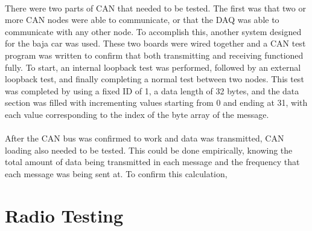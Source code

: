\paragraph{}
There were two parts of CAN that needed to be tested.
The first was that two or more CAN nodes were able to communicate, or that the DAQ was able to communicate with any other node.
To accomplish this, another system designed for the baja car was used.
These two boards were wired together and a CAN test program was written to confirm that both transmitting and receiving functioned fully.
To start, an internal loopback test was performed, followed by an external loopback test, and finally completing a normal test between two nodes.
This test was completed by using a fixed ID of 1, a data length of 32 bytes, and the data section was filled with incrementing values starting from 0 and ending at 31, with each value corresponding to the index of the byte array of the message.

\paragraph{}
After the CAN bus was confirmed to work and data was transmitted, CAN loading also needed to be tested.
This could be done empirically, knowing the total amount of data being transmitted in each message and the frequency that each message was being sent at.
To confirm this calculation, 

\section{Radio Testing}

\paragraph{}
